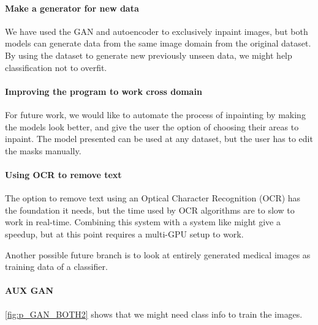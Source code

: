 \paragraph{Make a generator for new data}
We have used the GAN and autoencoder to exclusively inpaint images, but both models can generate data from the same image domain from the original dataset.
By using the dataset to generate new previously unseen data, we might help classification not to overfit.



\paragraph{Improving the program to work cross domain}
For future work, we would like to automate the process of inpainting by making the models look better, and give the user the option of choosing their areas to inpaint. The model presented can be used at any dataset, but the user has to edit the masks manually. 

\paragraph{Using OCR to remove text}
The option to remove text using an Optical Character Recognition (OCR) has the foundation it needs, but the time used by OCR algorithms are to slow to work in real-time. 
Combining this system with a system like  might give a speedup, but at this point requires a multi-GPU setup to work.

Another possible future branch is to look at entirely generated medical images as training data of a classifier. 


\paragraph{AUX GAN}
\ref{fig:p_GAN_BOTH2} shows that we might need class info to train the images.